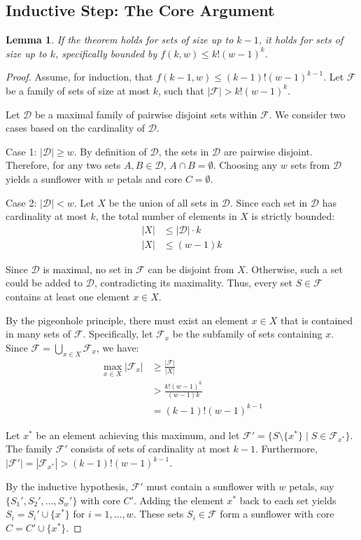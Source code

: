 \documentclass[12pt,a4paper]{article}
\newtheorem{lemma}[theorem]{Lemma}
\begin{document}
\subsection{Inductive Step: The Core Argument}
\begin{lemma} \label{lem:inductive_step}
If the theorem holds for sets of size up to $k-1$, it holds for sets of size up to $k$, specifically bounded by $f(k, w) \le k!(w-1)^k$.
\end{lemma}
\begin{proof}
Assume, for induction, that $f(k-1, w) \le (k-1)!(w-1)^{k-1}$. Let $\mathcal{F}$ be a family of sets of size at most $k$, such that $|\mathcal{F}| > k!(w-1)^k$.

Let $\mathcal{D}$ be a maximal family of pairwise disjoint sets within $\mathcal{F}$. We consider two cases based on the cardinality of $\mathcal{D}$.

Case 1: $|\mathcal{D}| \ge w$.
By definition of $\mathcal{D}$, the sets in $\mathcal{D}$ are pairwise disjoint. Therefore, for any two sets $A, B \in \mathcal{D}$, $A \cap B = \emptyset$. Choosing any $w$ sets from $\mathcal{D}$ yields a sunflower with $w$ petals and core $C = \emptyset$.

Case 2: $|\mathcal{D}| < w$.
Let $X$ be the union of all sets in $\mathcal{D}$. Since each set in $\mathcal{D}$ has cardinality at most $k$, the total number of elements in $X$ is strictly bounded:
\begin{align}
|X| &\le |\mathcal{D}| \cdot k \nonumber \\
|X| &\le (w - 1)k \label{eq:bound_x}
\end{align}

Since $\mathcal{D}$ is maximal, no set in $\mathcal{F}$ can be disjoint from $X$. Otherwise, such a set could be added to $\mathcal{D}$, contradicting its maximality. Thus, every set $S \in \mathcal{F}$ contains at least one element $x \in X$.

By the pigeonhole principle, there must exist an element $x \in X$ that is contained in many sets of $\mathcal{F}$. Specifically, let $\mathcal{F}_x$ be the subfamily of sets containing $x$. Since $\mathcal{F} = \bigcup_{x \in X} \mathcal{F}_x$, we have:
\begin{align}
\max_{x \in X} |\mathcal{F}_x| &\ge \frac{|\mathcal{F}|}{|X|} \nonumber \\
&> \frac{k!(w-1)^k}{(w-1)k} \nonumber \\
&= (k-1)!(w-1)^{k-1}
\end{align}

Let $x^*$ be an element achieving this maximum, and let $\mathcal{F}' = \{ S \setminus \{x^*\} \mid S \in \mathcal{F}_{x^*} \}$. The family $\mathcal{F}'$ consists of sets of cardinality at most $k-1$. Furthermore, $|\mathcal{F}'| = |\mathcal{F}_{x^*}| > (k-1)!(w-1)^{k-1}$.

By the inductive hypothesis, $\mathcal{F}'$ must contain a sunflower with $w$ petals, say $\{ S_1', S_2', \dots, S_w' \}$ with core $C'$. Adding the element $x^*$ back to each set yields $S_i = S_i' \cup \{x^*\}$ for $i = 1, \dots, w$. These sets $S_i \in \mathcal{F}$ form a sunflower with core $C = C' \cup \{x^*\}$.
\end{proof}
\end{document}
